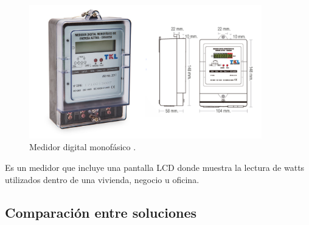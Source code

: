 \begin{itemize}
\begin{figure}[htbp]
	\centering
	\includegraphics[width=0.9\textwidth]{./Figures/medidor.png}
	\caption{Medidor digital monofásico \protect\footnotemark.}
	\label{fig:medidor}
\end{figure}


Es un medidor que incluye una pantalla LCD donde muestra la lectura de watts utilizados dentro de una vivienda, negocio u oficina.

\end{itemize}

\subsection{Comparación entre soluciones}

